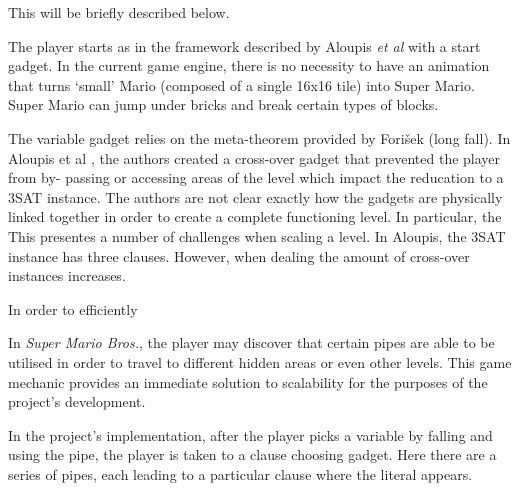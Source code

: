 \documentclass[11pt, a4paper, oneside]{report} %
\begin{document}
This will be briefly described below.

The player starts as in the framework described by Aloupis \textit{et
al}\cite{Aloupis2012} with a start gadget. In the current game engine, there is
no necessity to have an animation that turns `small' Mario (composed of a single 16x16 tile) into Super
Mario. Super Mario can jump under bricks and break certain types of blocks. 


The variable gadget relies on the meta-theorem provided by Fori\v{s}ek
\cite{DBLP:conf/fun/Forisek10} (long fall). In Aloupis et al \cite{Aloupis2012},
the authors created a cross-over gadget that prevented the player from by-
passing or accessing areas of the level which impact the reducation to a 3SAT
instance. The authors are not clear exactly how the gadgets are physically
linked together in order to create a complete functioning level. In particular,
the  This presentes a number of challenges when scaling a level. In Aloupis, the
3SAT instance has three clauses. However, when dealing the amount of cross-over
instances increases.

In order to efficiently

In \textit{Super Mario Bros.}, the player may discover that certain pipes are
able to be utilised in order to travel to different hidden areas or even other
levels. This game mechanic provides an immediate solution to scalability for the
purposes of the project's development.

In the project's implementation, after the player picks a variable by falling
and using the pipe, the player is taken to a clause choosing gadget. Here there
are a series of pipes, each leading to a particular clause where the literal
appears.
\end{document}
